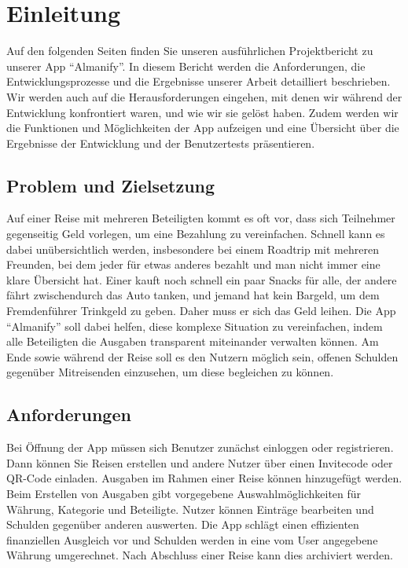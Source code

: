 \section{Einleitung}

Auf den folgenden Seiten finden Sie unseren ausführlichen Projektbericht zu unserer App \enquote{Almanify}.
In diesem Bericht werden die Anforderungen, die Entwicklungsprozesse und die Ergebnisse unserer Arbeit detailliert beschrieben.
Wir werden auch auf die Herausforderungen eingehen, mit denen wir während der Entwicklung konfrontiert waren, und wie wir sie gelöst haben.
Zudem werden wir die Funktionen und Möglichkeiten der App aufzeigen und eine Übersicht über die Ergebnisse der Entwicklung und der Benutzertests präsentieren.

\subsection{Problem und Zielsetzung}

Auf einer Reise mit mehreren Beteiligten kommt es oft vor, dass sich Teilnehmer gegenseitig Geld vorlegen, um eine Bezahlung zu vereinfachen.
Schnell kann es dabei unübersichtlich werden, insbesondere bei einem Roadtrip mit mehreren Freunden,
bei dem jeder für etwas anderes bezahlt und man nicht immer eine klare Übersicht hat.
Einer kauft noch schnell ein paar Snacks für alle, der andere fährt zwischendurch das Auto tanken,
und jemand hat kein Bargeld, um dem Fremdenführer Trinkgeld zu geben.
Daher muss er sich das Geld leihen.
Die App \enquote{Almanify} soll dabei helfen, diese komplexe Situation zu vereinfachen, indem alle Beteiligten die Ausgaben transparent miteinander verwalten können.
Am Ende sowie während der Reise soll es den Nutzern möglich sein, offenen Schulden gegenüber Mitreisenden einzusehen, um diese begleichen zu können.

\subsection{Anforderungen}

Bei Öffnung der App müssen sich Benutzer zunächst einloggen oder registrieren.
Dann können Sie Reisen erstellen und andere Nutzer über einen Invitecode oder QR-Code einladen.
Ausgaben im Rahmen einer Reise können hinzugefügt werden.
Beim Erstellen von Ausgaben gibt vorgegebene Auswahlmöglichkeiten für Währung, Kategorie und Beteiligte.
Nutzer können Einträge bearbeiten und Schulden gegenüber anderen auswerten.
Die App schlägt einen effizienten finanziellen Ausgleich vor und Schulden werden in eine vom User angegebene Währung umgerechnet.
Nach Abschluss einer Reise kann dies archiviert werden.

